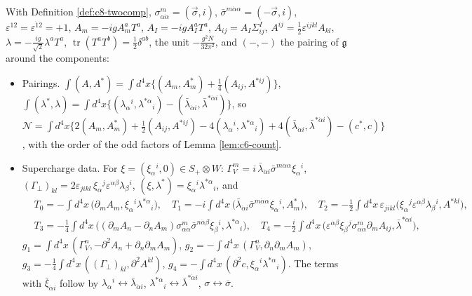 \begin{remark}
\label{rem:c12-twocomp}
With Definition \ref{def:c8-twocomp}, $\sigma^m_{\alpha\dot\alpha}=(\vec\sigma,i)$, $\bar\sigma^{m\dot\alpha\alpha}=(-\vec\sigma,i)$, $\varepsilon^{12}=\varepsilon^{\dot1\dot2}=+1$, $A_m=-igA^a_mT^a$, $A_I=-igA^a_IT^a$, $A_{ij}=A_I\Sigma^I_{ij}$, $A^{ij}=\tfrac12\varepsilon^{ijkl}A_{kl}$, $\lambda=-\tfrac{ig}{\sqrt2}\lambda^aT^a$, $\operatorname{tr}(T^aT^b)=\tfrac12\delta^{ab}$, the unit $-\tfrac{g^2N}{32\pi^2}$, and $(-,-)$ the pairing of $\mathfrak g$ around the components:
\begin{itemize}
\item Pairings. $\int(A,A^*)=\int d^4x\{(A_m,A^*_m)+\tfrac14(A_{ij},A^{*ij})\}$, $\int(\lambda^*,\lambda)=\int d^4x\{(\lambda_\alpha{}^i,\lambda^{*\alpha}{}_i)-(\bar\lambda_{\dot\alpha i},\bar\lambda^{*\dot\alpha i})\}$, so $\mathcal N=\int d^4x\{2(A_m,A^*_m)+\tfrac12(A_{ij},A^{*ij})-4(\lambda_\alpha{}^i,\lambda^{*\alpha}{}_i)+4(\bar\lambda_{\dot\alpha i},\bar\lambda^{*\dot\alpha i})-(c^*,c)\}$, with the order of the odd factors of Lemma \ref{lem:c6-count}.
\item Supercharge data. For $\xi=(\xi_\alpha{}^i,0)\in S_+\otimes W$: $\Gamma_V^m=i\,\bar\lambda_{\dot\alpha i}\bar\sigma^{m\dot\alpha\alpha}\xi_\alpha{}^i$, $(\Gamma_\perp)_{kl}=2\varepsilon_{jikl}\,\xi_\alpha{}^j\varepsilon^{\alpha\beta}\lambda_\beta{}^i$, $(\xi,\lambda^*)=\xi_\alpha{}^i\lambda^{*\alpha}{}_i$, and
\[
\begin{aligned}
&T_0=-\int d^4x\,\big(\partial_mA_m,\xi_\alpha{}^i\lambda^{*\alpha}{}_i\big),\quad T_1=-i\int d^4x\,\big(\bar\lambda_{\dot\alpha i}\bar\sigma^{m\dot\alpha\alpha}\xi_\alpha{}^i,A^*_m\big),\quad T_2=-\tfrac12\int d^4x\,\varepsilon_{jikl}\big(\xi_\alpha{}^j\varepsilon^{\alpha\beta}\lambda_\beta{}^i,A^{*kl}\big),\\
&T_3=-\tfrac14\int d^4x\,\big((\partial_mA_n-\partial_nA_m)\sigma^m_{\alpha\dot\alpha}\bar\sigma^{n\dot\alpha\beta}\xi_\beta{}^i,\lambda^{*\alpha}{}_i\big),\quad T_4=-\tfrac i2\int d^4x\,\big(\varepsilon^{\alpha\beta}\xi_\beta{}^j\sigma^m_{\alpha\dot\alpha}\partial_mA_{ij},\bar\lambda^{*\dot\alpha i}\big),
\end{aligned}
\]
$g_1=\int d^4x\,(\Gamma_V^n,-\partial^2A_n+\partial_n\partial_mA_m)$, $g_2=-\int d^4x\,(\Gamma_V^n,\partial_n\partial_mA_m)$, $g_3=-\tfrac14\int d^4x\,((\Gamma_\perp)_{kl},\partial^2A^{kl})$, $g_4=-\int d^4x\,(\partial^2c,\xi_\alpha{}^i\lambda^{*\alpha}{}_i)$. The terms with $\bar\xi_{\dot\alpha i}$ follow by $\lambda_\alpha{}^i\leftrightarrow\bar\lambda_{\dot\alpha i}$, $\lambda^{*\alpha}{}_i\leftrightarrow\bar\lambda^{*\dot\alpha i}$, $\sigma\leftrightarrow\bar\sigma$.

\end{itemize}
\end{remark}
